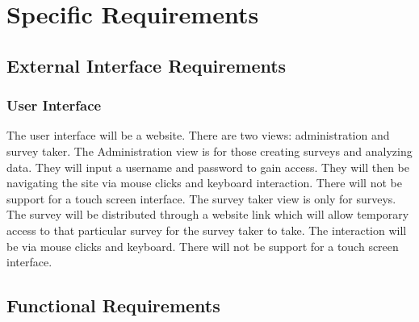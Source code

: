 \documentclass[letterpaper,10pt,titlepage, draftclsnofoot,onecolumn]{IEEEtran}
\begin{document}
\section{Specific Requirements}
\subsection{External Interface Requirements}
\subsubsection{User Interface}
The user interface will be a website. There are two views: administration and survey taker. 
The Administration view is for those creating surveys and analyzing data. They will input a 
username and password to gain access. They will then be navigating the site via mouse clicks 
and keyboard interaction. There will not be support for a touch screen interface. The survey
taker view is only for surveys. The survey will be distributed through a website link which 
will allow temporary access to that particular survey for the survey taker to take. The 
interaction will be via mouse clicks and keyboard. There will not be support for a touch screen
interface.

\subsection{Functional Requirements}
\end{document}
